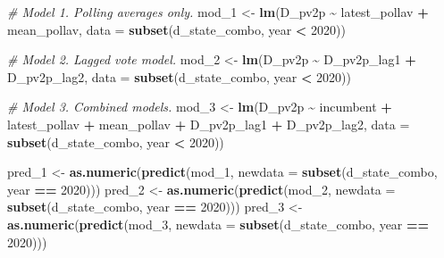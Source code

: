 \documentclass[
]{article}
\newenvironment{Shaded}{\begin{snugshade}}{\end{snugshade}}
\newcommand{\AttributeTok}[1]{\textcolor[rgb]{0.13,0.29,0.53}{#1}}
\newcommand{\CommentTok}[1]{\textcolor[rgb]{0.56,0.35,0.01}{\textit{#1}}}
\newcommand{\DecValTok}[1]{\textcolor[rgb]{0.00,0.00,0.81}{#1}}
\newcommand{\FunctionTok}[1]{\textcolor[rgb]{0.13,0.29,0.53}{\textbf{#1}}}
\newcommand{\NormalTok}[1]{#1}
\newcommand{\OtherTok}[1]{\textcolor[rgb]{0.56,0.35,0.01}{#1}}
\newcommand{\SpecialCharTok}[1]{\textcolor[rgb]{0.81,0.36,0.00}{\textbf{#1}}}
\begin{document}
\begin{Shaded}
\begin{Highlighting}[]
\CommentTok{\# Model 1. Polling averages only. }
\NormalTok{mod\_1 }\OtherTok{\textless{}{-}} \FunctionTok{lm}\NormalTok{(D\_pv2p }\SpecialCharTok{\textasciitilde{}}\NormalTok{ latest\_pollav }\SpecialCharTok{+}\NormalTok{ mean\_pollav, }
            \AttributeTok{data =} \FunctionTok{subset}\NormalTok{(d\_state\_combo, year }\SpecialCharTok{\textless{}} \DecValTok{2020}\NormalTok{))}
\end{Highlighting}
\end{Shaded}

\begin{Shaded}
\begin{Highlighting}[]
\CommentTok{\# Model 2. Lagged vote model. }
\NormalTok{mod\_2 }\OtherTok{\textless{}{-}} \FunctionTok{lm}\NormalTok{(D\_pv2p }\SpecialCharTok{\textasciitilde{}}\NormalTok{ D\_pv2p\_lag1 }\SpecialCharTok{+}\NormalTok{ D\_pv2p\_lag2, }
            \AttributeTok{data =} \FunctionTok{subset}\NormalTok{(d\_state\_combo, year }\SpecialCharTok{\textless{}} \DecValTok{2020}\NormalTok{))}
\end{Highlighting}
\end{Shaded}

\begin{Shaded}
\begin{Highlighting}[]
\CommentTok{\# Model 3. Combined models. }
\NormalTok{mod\_3 }\OtherTok{\textless{}{-}} \FunctionTok{lm}\NormalTok{(D\_pv2p }\SpecialCharTok{\textasciitilde{}}\NormalTok{ incumbent }\SpecialCharTok{+}\NormalTok{ latest\_pollav }\SpecialCharTok{+}\NormalTok{ mean\_pollav }\SpecialCharTok{+}\NormalTok{ D\_pv2p\_lag1 }\SpecialCharTok{+}\NormalTok{ D\_pv2p\_lag2, }
            \AttributeTok{data =} \FunctionTok{subset}\NormalTok{(d\_state\_combo, year }\SpecialCharTok{\textless{}} \DecValTok{2020}\NormalTok{))}
\end{Highlighting}
\end{Shaded}

\begin{Shaded}
\begin{Highlighting}[]
\NormalTok{pred\_1 }\OtherTok{\textless{}{-}} \FunctionTok{as.numeric}\NormalTok{(}\FunctionTok{predict}\NormalTok{(mod\_1, }\AttributeTok{newdata =} \FunctionTok{subset}\NormalTok{(d\_state\_combo, year }\SpecialCharTok{==} \DecValTok{2020}\NormalTok{)))}
\NormalTok{pred\_2 }\OtherTok{\textless{}{-}} \FunctionTok{as.numeric}\NormalTok{(}\FunctionTok{predict}\NormalTok{(mod\_2, }\AttributeTok{newdata =} \FunctionTok{subset}\NormalTok{(d\_state\_combo, year }\SpecialCharTok{==} \DecValTok{2020}\NormalTok{)))}
\NormalTok{pred\_3 }\OtherTok{\textless{}{-}} \FunctionTok{as.numeric}\NormalTok{(}\FunctionTok{predict}\NormalTok{(mod\_3, }\AttributeTok{newdata =} \FunctionTok{subset}\NormalTok{(d\_state\_combo, year }\SpecialCharTok{==} \DecValTok{2020}\NormalTok{)))}
\end{Highlighting}
\end{Shaded}
\end{document}
